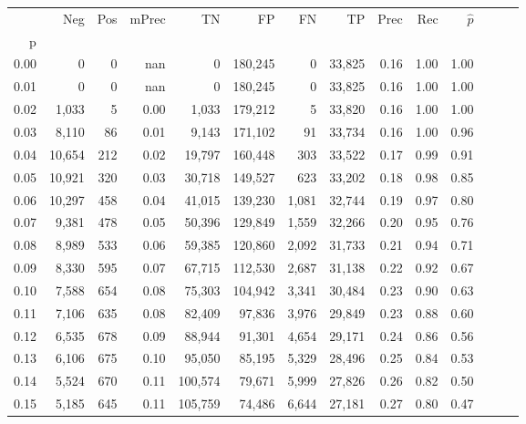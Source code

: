 \begin{tabular}{rrrrrrrrrrrrrr}
\toprule
{} &     Neg &  Pos & mPrec &       TN &       FP &      FN &      TP &  Prec &   Rec & $\hat{p}$ \\
p    &         &      &       &          &          &         &         &       &       &           \\
\midrule
0.00 &       0 &    0 &   nan &        0 &  180,245 &       0 &  33,825 &  0.16 &  1.00 &      1.00 \\
0.01 &       0 &    0 &   nan &        0 &  180,245 &       0 &  33,825 &  0.16 &  1.00 &      1.00 \\
0.02 &   1,033 &    5 &  0.00 &    1,033 &  179,212 &       5 &  33,820 &  0.16 &  1.00 &      1.00 \\
0.03 &   8,110 &   86 &  0.01 &    9,143 &  171,102 &      91 &  33,734 &  0.16 &  1.00 &      0.96 \\
0.04 &  10,654 &  212 &  0.02 &   19,797 &  160,448 &     303 &  33,522 &  0.17 &  0.99 &      0.91 \\
0.05 &  10,921 &  320 &  0.03 &   30,718 &  149,527 &     623 &  33,202 &  0.18 &  0.98 &      0.85 \\
0.06 &  10,297 &  458 &  0.04 &   41,015 &  139,230 &   1,081 &  32,744 &  0.19 &  0.97 &      0.80 \\
0.07 &   9,381 &  478 &  0.05 &   50,396 &  129,849 &   1,559 &  32,266 &  0.20 &  0.95 &      0.76 \\
0.08 &   8,989 &  533 &  0.06 &   59,385 &  120,860 &   2,092 &  31,733 &  0.21 &  0.94 &      0.71 \\
0.09 &   8,330 &  595 &  0.07 &   67,715 &  112,530 &   2,687 &  31,138 &  0.22 &  0.92 &      0.67 \\
0.10 &   7,588 &  654 &  0.08 &   75,303 &  104,942 &   3,341 &  30,484 &  0.23 &  0.90 &      0.63 \\
0.11 &   7,106 &  635 &  0.08 &   82,409 &   97,836 &   3,976 &  29,849 &  0.23 &  0.88 &      0.60 \\
0.12 &   6,535 &  678 &  0.09 &   88,944 &   91,301 &   4,654 &  29,171 &  0.24 &  0.86 &      0.56 \\
0.13 &   6,106 &  675 &  0.10 &   95,050 &   85,195 &   5,329 &  28,496 &  0.25 &  0.84 &      0.53 \\
0.14 &   5,524 &  670 &  0.11 &  100,574 &   79,671 &   5,999 &  27,826 &  0.26 &  0.82 &      0.50 \\
0.15 &   5,185 &  645 &  0.11 &  105,759 &   74,486 &   6,644 &  27,181 &  0.27 &  0.80 &      0.47 \\

\end{tabular}
